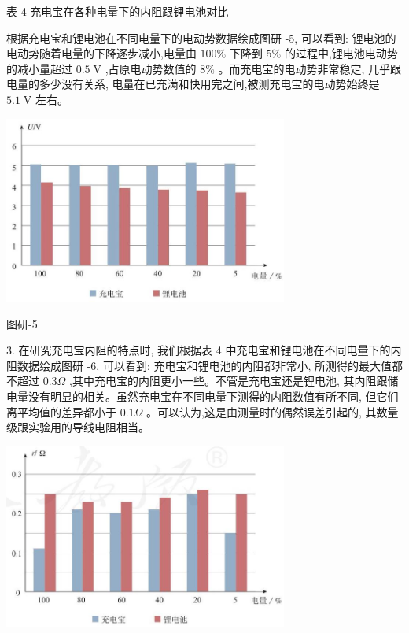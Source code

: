 \documentclass[10pt]{article}
\begin{document}
表 4 充电宝在各种电量下的内阻跟锂电池对比

\begin{center}
\end{center}

根据充电宝和锂电池在不同电量下的电动势数据绘成图研 -5, 可以看到: 锂电池的电动势随着电量的下降逐步减小,电量由 \({100}\%\) 下降到 \(5\%\) 的过程中,锂电池电动势的减小量超过 \({0.5}\mathrm{\;V}\) ,占原电动势数值的 \(8\%\) 。而充电宝的电动势非常稳定, 几乎跟电量的多少没有关系, 电量在已充满和快用完之间,被测充电宝的电动势始终是 \({5.1}\mathrm{\;V}\) 左右。

\begin{center}
\includegraphics[max width=0.7\textwidth]{images/01911d5f-8e38-70c0-b5b8-2b399bd115b6_139_265007.jpg}
\end{center}

图研-5

3. 在研究充电宝内阻的特点时, 我们根据表 4 中充电宝和锂电池在不同电量下的内阻数据绘成图研 -6, 可以看到: 充电宝和锂电池的内阻都非常小, 所测得的最大值都不超过 \({0.3\Omega }\) ,其中充电宝的内阻更小一些。不管是充电宝还是锂电池, 其内阻跟储电量没有明显的相关。虽然充电宝在不同电量下测得的内阻数值有所不同, 但它们离平均值的差异都小于 \({0.1\Omega }\) 。可以认为,这是由测量时的偶然误差引起的, 其数量级跟实验用的导线电阻相当。

\begin{center}
\includegraphics[max width=0.7\textwidth]{images/01911d5f-8e38-70c0-b5b8-2b399bd115b6_139_864176.jpg}
\end{center}
\end{document}
